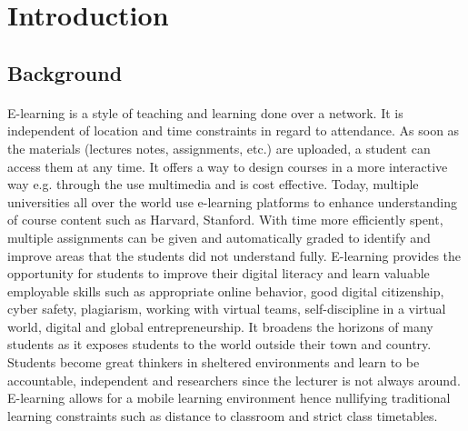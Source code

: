 \documentclass[12pt]{article}
\begin{document}
\section{Introduction}
	\subsection{Background}
\paragraph{} E-learning is a style of teaching and learning done over a network. It is independent of location and time constraints in regard to attendance. As soon as the materials (lectures notes, assignments, etc.) are uploaded, a student can access them at any time. It offers a way to design courses in a more interactive way e.g. through the use multimedia and is cost effective. Today, multiple universities all over the world use e-learning platforms to enhance understanding of course content such as Harvard, Stanford. With time more efficiently spent, multiple assignments can be given and automatically graded to identify and improve areas that the students did not understand fully. E-learning provides the opportunity for students to improve their digital literacy and learn valuable employable skills such as appropriate online behavior, good digital citizenship, cyber safety, plagiarism, working with virtual teams, self-discipline in a virtual world, digital and global entrepreneurship. It broadens the horizons of many students as it exposes students to the world outside their town and country. Students become great thinkers in sheltered environments and learn to be accountable, independent and researchers since the lecturer is not always around. E-learning allows for a mobile learning environment hence nullifying traditional learning constraints such as distance to classroom and strict class timetables.
\end{document}
